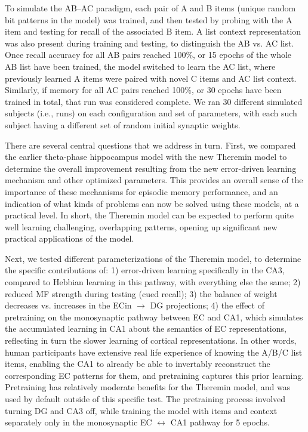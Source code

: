 \documentclass[11pt,twoside]{article}
\newif\myifpdf
\begin{document}
To simulate the AB--AC paradigm, each pair of A and B items (unique random bit patterns in the model) was trained, and then tested by probing with the A item and testing for recall of the associated B item.  A list context representation was also present during training and testing, to distinguish the AB vs. AC list.  Once recall accuracy for all AB pairs reached 100\%, or 15 epochs of the whole AB list have been trained, the model switched to learn the AC list, where previously learned A items were paired with novel C items and AC list context. Similarly, if memory for all AC pairs reached 100\%, or 30 epochs have been trained in total, that run was considered complete.  We ran 30 different simulated subjects (i.e., runs) on each configuration and set of parameters, with each such subject having a different set of random initial synaptic weights. 

There are several central questions that we address in turn.  First, we compared the earlier theta-phase hippocampus model with the new Theremin model to determine the overall improvement resulting from the new error-driven learning mechanism and other optimized parameters.  This provides an overall sense of the importance of these mechanisms for episodic memory performance, and an indication of what kinds of problems can now be solved using these models, at a practical level.  In short, the Theremin model can be expected to perform quite well learning challenging, overlapping patterns, opening up significant new practical applications of the model.

Next, we tested different parameterizations of the Theremin model, to determine the specific contributions of: 1) error-driven learning specifically in the CA3, compared to Hebbian learning in this pathway, with everything else the same; 2) reduced MF strength during testing (cued recall); 3) the balance of weight decreases vs. increases in the ECin $\rightarrow$ DG projections; 4) the effect of pretraining on the monosynaptic pathway between EC and CA1, which simulates the accumulated learning in CA1 about the semantics of EC representations, reflecting in turn the slower learning of cortical representations. In other words, human participants have extensive real life experience of knowing the A/B/C list items, enabling the CA1 to already be able to invertably reconstruct the corresponding EC patterns for them, and pretraining captures this prior learning.  Pretraining has relatively moderate benefits for the Theremin model, and was used by default outside of this specific test.  The pretraining process involved turning DG and CA3 off, while training the model with items and context separately only in the monosynaptic EC $\leftrightarrow$ CA1 pathway for 5 epochs. 
\end{document}
